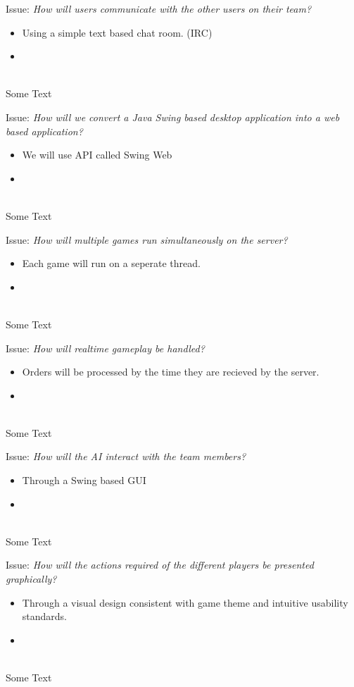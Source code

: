 Issue: \textit{How will users communicate with the other users on their team?}
\\
  \begin{itemize}
    \item Using a simple text based chat room. (IRC)
    \item 
  \end{itemize}
\\
Some Text

Issue: \textit{How will we convert a Java Swing based desktop application into a web based application?}
\\
  \begin{itemize}
    \item We will use API called Swing Web
    \item 
  \end{itemize}
\\
Some Text

Issue: \textit{How will multiple games run simultaneously on the server?}
\\
  \begin{itemize}
    \item Each game will run on a seperate thread.
    \item 
  \end{itemize}
\\
Some Text

Issue: \textit{How will realtime gameplay be handled?}
\\
  \begin{itemize}
    \item Orders will be processed by the time they are recieved by the server.
    \item 
  \end{itemize}
\\
Some Text

Issue: \textit{How will the AI interact with the team members?}
\\
  \begin{itemize}
    \item Through a Swing based GUI
    \item 
  \end{itemize}
\\
Some Text

Issue: \textit{How will the actions required of the different players be presented graphically?}
\\
  \begin{itemize}
    \item Through a visual design consistent with game theme and intuitive usability standards.
    \item 
  \end{itemize}
\\
Some Text

